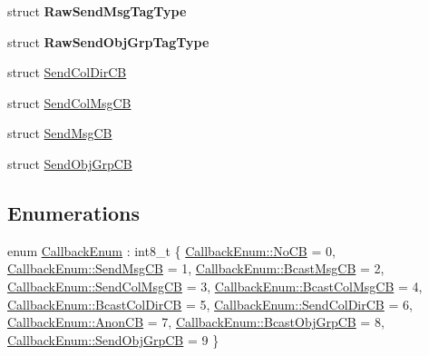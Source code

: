 \begin{DoxyCompactItemize}
\item 
struct {\bfseries Raw\+Send\+Msg\+Tag\+Type}
\item 
struct {\bfseries Raw\+Send\+Obj\+Grp\+Tag\+Type}
\item 
struct \hyperlink{structvt_1_1pipe_1_1callback_1_1cbunion_1_1_send_col_dir_c_b}{Send\+Col\+Dir\+CB}
\item 
struct \hyperlink{structvt_1_1pipe_1_1callback_1_1cbunion_1_1_send_col_msg_c_b}{Send\+Col\+Msg\+CB}
\item 
struct \hyperlink{structvt_1_1pipe_1_1callback_1_1cbunion_1_1_send_msg_c_b}{Send\+Msg\+CB}
\item 
struct \hyperlink{structvt_1_1pipe_1_1callback_1_1cbunion_1_1_send_obj_grp_c_b}{Send\+Obj\+Grp\+CB}
\end{DoxyCompactItemize}
\subsection*{Enumerations}
\begin{DoxyCompactItemize}
\item 
enum \hyperlink{namespacevt_1_1pipe_1_1callback_1_1cbunion_ac8b41526501e39ec73a5fde238b996b4}{Callback\+Enum} \+: int8\+\_\+t \{ \newline
\hyperlink{namespacevt_1_1pipe_1_1callback_1_1cbunion_ac8b41526501e39ec73a5fde238b996b4a29782dfeb3ca8db391fbf8e43f240dc2}{Callback\+Enum\+::\+No\+CB} = 0, 
\hyperlink{namespacevt_1_1pipe_1_1callback_1_1cbunion_ac8b41526501e39ec73a5fde238b996b4a2fd34e7b68fef8c346691fbd07d7484e}{Callback\+Enum\+::\+Send\+Msg\+CB} = 1, 
\hyperlink{namespacevt_1_1pipe_1_1callback_1_1cbunion_ac8b41526501e39ec73a5fde238b996b4ac1aca4d8a6829a89e06d20e0fd9f118e}{Callback\+Enum\+::\+Bcast\+Msg\+CB} = 2, 
\hyperlink{namespacevt_1_1pipe_1_1callback_1_1cbunion_ac8b41526501e39ec73a5fde238b996b4a2286d20b807a8b27fbb57a105c60c805}{Callback\+Enum\+::\+Send\+Col\+Msg\+CB} = 3, 
\newline
\hyperlink{namespacevt_1_1pipe_1_1callback_1_1cbunion_ac8b41526501e39ec73a5fde238b996b4adbe902b7853fcba097e950af756a711d}{Callback\+Enum\+::\+Bcast\+Col\+Msg\+CB} = 4, 
\hyperlink{namespacevt_1_1pipe_1_1callback_1_1cbunion_ac8b41526501e39ec73a5fde238b996b4aba9116c20cb9e2cba429d49a2b49db28}{Callback\+Enum\+::\+Bcast\+Col\+Dir\+CB} = 5, 
\hyperlink{namespacevt_1_1pipe_1_1callback_1_1cbunion_ac8b41526501e39ec73a5fde238b996b4af6385447cc92b32dcdf600cf4a828239}{Callback\+Enum\+::\+Send\+Col\+Dir\+CB} = 6, 
\hyperlink{namespacevt_1_1pipe_1_1callback_1_1cbunion_ac8b41526501e39ec73a5fde238b996b4a4e3f23f80d17e652ec7089a6b84e5051}{Callback\+Enum\+::\+Anon\+CB} = 7, 
\newline
\hyperlink{namespacevt_1_1pipe_1_1callback_1_1cbunion_ac8b41526501e39ec73a5fde238b996b4a585a1913f0bbaeecac0c8c4a3472adc2}{Callback\+Enum\+::\+Bcast\+Obj\+Grp\+CB} = 8, 
\hyperlink{namespacevt_1_1pipe_1_1callback_1_1cbunion_ac8b41526501e39ec73a5fde238b996b4adfb74177ee87ea06f3e829aa6597b459}{Callback\+Enum\+::\+Send\+Obj\+Grp\+CB} = 9
 \}
\end{DoxyCompactItemize}


